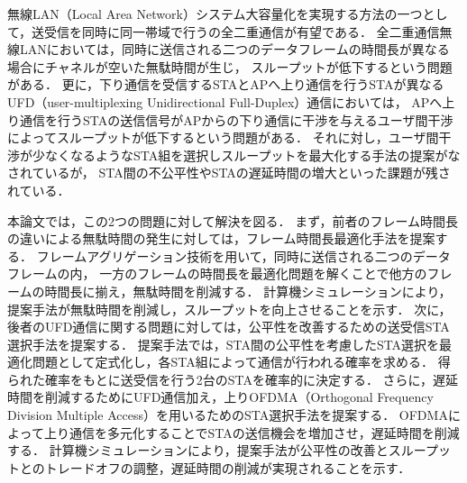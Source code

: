 \documentclass[master]{kuisthesis}		%
\date{平成28年2月8日}				%
\begin{document}
\maketitle					%

\begin{jabstract}				%
	無線LAN（Local Area Network）システム大容量化を実現する方法の一つとして，送受信を同時に同一帯域で行うの全二重通信が有望である．
	全二重通信無線LANにおいては，同時に送信される二つのデータフレームの時間長が異なる場合にチャネルが空いた無駄時間が生じ，
	スループットが低下するという問題がある．
	更に，下り通信を受信するSTAとAPへ上り通信を行うSTAが異なるUFD（user-multiplexing Unidirectional Full-Duplex）通信においては，
	APへ上り通信を行うSTAの送信信号がAPからの下り通信に干渉を与えるユーザ間干渉によってスループットが低下するという問題がある．
	それに対し，ユーザ間干渉が少なくなるようなSTA組を選択しスループットを最大化する手法の提案がなされているが，
	STA間の不公平性やSTAの遅延時間の増大といった課題が残されている．
	\par
	本論文では，この2つの問題に対して解決を図る．
	まず，前者のフレーム時間長の違いによる無駄時間の発生に対しては，フレーム時間長最適化手法を提案する．
	フレームアグリゲーション技術を用いて，同時に送信される二つのデータフレームの内，
	一方のフレームの時間長を最適化問題を解くことで他方のフレームの時間長に揃え，無駄時間を削減する．
	計算機シミュレーションにより，提案手法が無駄時間を削減し，スループットを向上させることを示す．
	次に，後者のUFD通信に関する問題に対しては，公平性を改善するための送受信STA選択手法を提案する．
	提案手法では，STA間の公平性を考慮したSTA選択を最適化問題として定式化し，各STA組によって通信が行われる確率を求める．
	得られた確率をもとに送受信を行う2台のSTAを確率的に決定する．
	さらに，遅延時間を削減するためにUFD通信加え，上りOFDMA（Orthogonal Frequency Division Multiple Access）を用いるためのSTA選択手法を提案する．
	OFDMAによって上り通信を多元化することでSTAの送信機会を増加させ，遅延時間を削減する．
	計算機シミュレーションにより，提案手法が公平性の改善とスループットとのトレードオフの調整，遅延時間の削減が実現されることを示す．
\end{jabstract}
\end{document}
